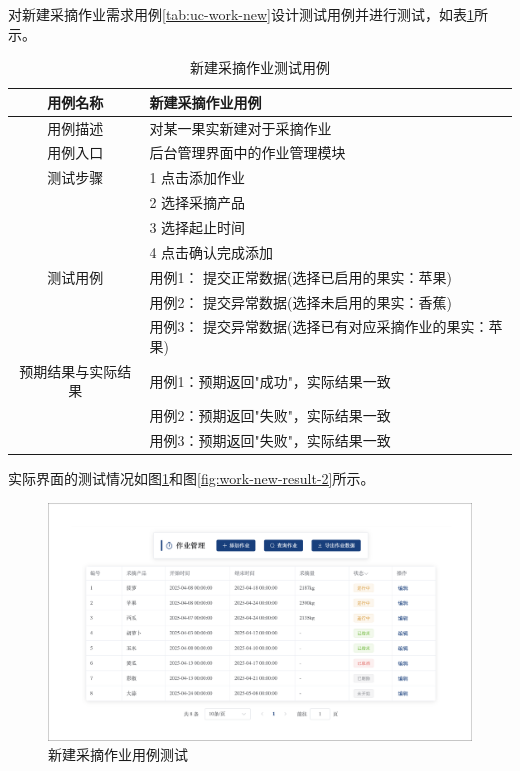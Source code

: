 对新建采摘作业需求用例\ref{tab:uc-work-new}设计测试用例并进行测试，如表\ref{tab:uc-work-new-test}所示。

\begin{longtable}[ht]{|c|p{8cm}|}
\caption{新建采摘作业测试用例}
\label{tab:uc-work-new-test}
\\
\hline
用例名称 & 新建采摘作业用例 \\
\hline
用例描述 & 对某一果实新建对于采摘作业 \\
\hline
用例入口 & 后台管理界面中的作业管理模块 \\
\hline
测试步骤 & 1 点击添加作业 \\
& 2 选择采摘产品 \\
& 3 选择起止时间 \\
& 4 点击确认完成添加 \\
\hline
测试用例 & 用例1： 提交正常数据(选择已启用的果实：苹果) \\
& 用例2： 提交异常数据(选择未启用的果实：香蕉) \\
\hline
& 用例3： 提交异常数据(选择已有对应采摘作业的果实：苹果) \\
\hline
预期结果与实际结果 & 用例1：预期返回"成功"，实际结果一致 \\
& 用例2：预期返回"失败"，实际结果一致 \\
& 用例3：预期返回"失败"，实际结果一致 \\
\hline
\end{longtable}

实际界面的测试情况如图\ref{fig:work-new-result-1}和图\ref{fig:work-new-result-2}所示。

\begin{figure}[H]
    \centering
    \includegraphics[width=0.9\linewidth]{../result/work-new-result-1.png}
    \caption{新建采摘作业用例测试}
    \label{fig:work-new-result-1}
\end{figure}

